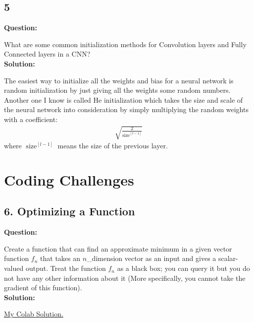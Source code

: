 \documentclass[a4paper]{article}
\begin{document}
\subsection*{5}
\textbf{Question:}

What are some common initialization methods for Convolution layers and Fully Connected layers in a CNN?\\
\textbf{Solution:}

The easiest way to initialize all the weights and bias for a neural network is random initialization by just giving all the weights some random numbers. Another one I know is called He initialization which takes the size and scale of the neural network into consideration by simply multiplying the random weights with a coefficient:
\begin{align*}
    \sqrt{\frac{2}{\operatorname{size}^{[l-1]}}}
\end{align*}
where $\operatorname{size}^{[l-1]}$ means the size of the previous layer.

\section*{Coding Challenges}
\subsection*{6. Optimizing a Function}
\textbf{Question:}

Create a function that can find an approximate minimum in a given vector function $f_n$ that takes an $n$\_dimension vector as an input and gives a scalar-valued output. Treat the function $f_n$ as a black box; you can query it but you do not have any other information about it (More specifically, you cannot take the gradient of this function).\\
\textbf{Solution:}

\href{https://colab.research.google.com/drive/1YZ73Dy30io64voNbD6G3seQ63Hi_LHGt?usp=sharing}{My Colab Solution.}
\end{document}
